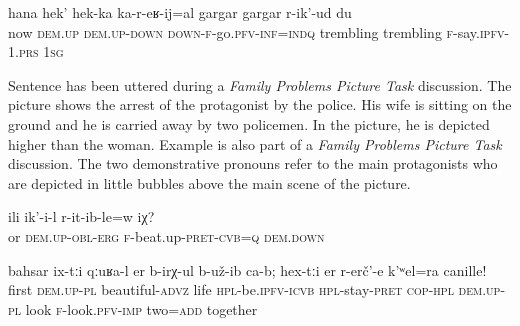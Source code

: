 \begin{exe}
		\label{If now she comes from over there I am trembling.}
	\sn
	\gll	hana	hek'	hek-ka	ka-r-eʁ-ij=al		gargar	gargar	r-ik'-ud	du \\
		now	\textsc{dem.up}	\textsc{dem.up-down}	\textsc{down-f}-go.\textsc{pfv}-\textsc{inf=indq}	trembling	trembling	\textsc{f-}say.\textsc{ipfv-1.prs}	\textsc{1sg}\\		
	\glt	{}

\end{exe}

Sentence  has been uttered during a \textit{Family Problems Picture Task} discussion. The picture shows the arrest of the protagonist by the police. His wife is sitting on the ground and he is carried away by two policemen. In the picture, he is depicted higher than the woman. Example  is also part of a \textit{Family Problems Picture Task} discussion. The two demonstrative pronouns refer to the main protagonists who are depicted in little bubbles above the main scene of the picture.

\begin{exe}
	\ex	\label{Or he did beat her?}
	\gll	ili	ik'-i-l	r-it-ib-le=w	iχ?\\
		or	\textsc{dem.up-obl-erg}	\textsc{f}-beat.up-\textsc{pret-cvb=q}	\textsc{dem.down}\\
	\glt	{}

	\ex	\label{It turns out that they lived well in the beginning. Look at them both together!}
	\gll	bahsar	ix-tːi	qːuʁa-l	er	b-irχ-ul	b-už-ib ca-b;	hex-tːi	er	r-erč'-e	k'ʷel=ra	canille!\\
		first	\textsc{dem.up}-\textsc{pl}	beautiful-\textsc{advz}	life	\textsc{hpl}-be.\textsc{ipfv}-\textsc{icvb}	\textsc{hpl}-stay-\textsc{pret} \textsc{cop-hpl}	\textsc{dem.up}-\textsc{pl}	look	\textsc{f}-look.\textsc{pfv-im}\textsc{p}	two=\textsc{add}	together\\
	\glt	{}
\end{exe}


